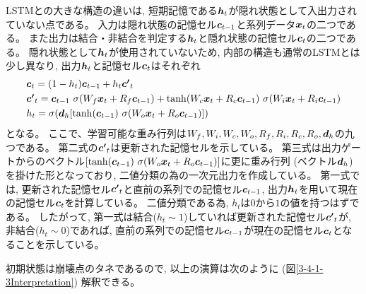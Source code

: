 LSTMとの大きな構造の違いは, 短期記憶である${\mbox{\boldmath{$h$}}}_t$が隠れ状態として入出力されていない点である。
入力は隠れ状態の記憶セル${\mbox{\boldmath{$c$}}}_{t-1}$と系列データ${\mbox{\boldmath{$x$}}}_t$の二つである。
また出力は結合・非結合を判定する${\mbox{\boldmath{$h$}}}_t$と隠れ状態の記憶セル${\mbox{\boldmath{$c$}}}_{t}$の二つである。
隠れ状態として${\mbox{\boldmath{$h$}}}_t$が使用されていないため, 内部の構造も通常のLSTMとは少し異なり, 出力${\mbox{\boldmath{$h$}}}_{t}$と記憶セル${\mbox{\boldmath{$c$}}}_{t}$はそれぞれ
\begin{equation}
 \begin{split}
  &{\mbox{\boldmath{$c$}}}_{t} 
  = (1-h_t) {\mbox{\boldmath{$c$}}}_{t-1} + h_t {\mbox{\boldmath{$c'$}}}_{t}\\
  &{\mbox{\boldmath{$c'$}}}_{t}
  = {\mbox{\boldmath{$c$}}}_{t-1} \  \sigma (W_f {\mbox{\boldmath{$x$}}}_t + R_f {\mbox{\boldmath{$c$}}}_{t-1}) 
  + \tanh (W_c {\mbox{\boldmath{$x$}}}_t + R_c {\mbox{\boldmath{$c$}}}_{t-1}) \  \sigma (W_i {\mbox{\boldmath{$x$}}}_t + R_i {\mbox{\boldmath{$c$}}}_{t-1})\\
  &h_{t} 
  = \sigma ({\mbox{\boldmath{$d$}}}_h [\tanh({\mbox{\boldmath{$c$}}}_{t-1}) \  \sigma (W_o {\mbox{\boldmath{$x$}}}_t + R_o {\mbox{\boldmath{$c$}}}_{t-1}) ])
 \end{split}
\end{equation}
となる。
ここで、学習可能な重み行列は$W_f, W_i, W_c, W_o, R_f, R_i, R_c, R_o, {\mbox{\boldmath{$d$}}}_h$の九つである。
第二式の${\mbox{\boldmath{$c'$}}}_{t}$は更新された記憶セルを示している。
第三式は出力ゲートからのベクトル$[\tanh({\mbox{\boldmath{$c$}}}_{t-1}) \  \sigma (W_o {\mbox{\boldmath{$x$}}}_t + R_o {\mbox{\boldmath{$c$}}}_{t-1})]$に更に重み行列 (ベクトル${\mbox{\boldmath{$d$}}}_h$) を掛けた形となっており, 二値分類の為の一次元出力を作成している。
第一式では, 更新された記憶セル${\mbox{\boldmath{$c'$}}}_{t}$と直前の系列での記憶セル${\mbox{\boldmath{$c$}}}_{t-1}$, 出力${\mbox{\boldmath{$h$}}}_{t}$を用いて現在の記憶セル${\mbox{\boldmath{$c$}}}_{t}$を計算している。
二値分類である為, $h_{t}$は$0$から$1$の値を持つはずである。
したがって, 第一式は結合($h_{t} \sim 1$)していれば更新された記憶セル${\mbox{\boldmath{$c'$}}}_{t}$が, 非結合($h_{t} \sim 0$)であれば, 直前の系列での記憶セル${\mbox{\boldmath{$c$}}}_{t-1}$が現在の記憶セル${\mbox{\boldmath{$c$}}}_{t}$となることを示している。

初期状態は崩壊点のタネであるので, 以上の演算は次のように (図\ref{3-4-1-3Interpretation}) 解釈できる。

